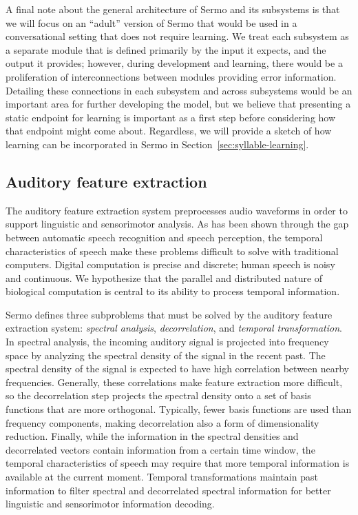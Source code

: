 A final note about
the general architecture of Sermo
and its subsystems
is that we will focus on an
``adult'' version of Sermo
that would be used in a conversational setting
that does not require learning.
We treat each subsystem as a separate
module that is defined primarily
by the input it expects,
and the output it provides;
however, during development
and learning,
there would be a proliferation of
interconnections between modules
providing error information.
Detailing these connections
in each subsystem and across subsystems
would be an important area
for further developing the model,
but we believe that presenting
a static endpoint for learning
is important as a first step
before considering
how that endpoint might come about.
Regardless, we will provide a sketch of
how learning can be incorporated in Sermo
in Section~\ref{sec:syllable-learning}.

\subsection{Auditory feature extraction}
\label{sec:model-ncc}


The auditory feature extraction system
preprocesses audio waveforms
in order to support
linguistic and sensorimotor analysis.
As has been shown through
the gap between
automatic speech recognition
and speech perception,
the temporal characteristics
of speech
make these problems
difficult to solve
with traditional computers.
Digital computation is precise and discrete;
human speech is noisy and continuous.
We hypothesize that the
parallel and distributed nature
of biological computation
is central to its
ability to process temporal information.

Sermo defines three subproblems
that must be solved
by the auditory feature extraction system:
\textit{spectral analysis},
\textit{decorrelation},
and \textit{temporal transformation}.
In spectral analysis,
the incoming auditory signal
is projected into frequency space
by analyzing the spectral density
of the signal in the recent past.
The spectral density of the signal
is expected to have high
correlation between nearby frequencies.
Generally, these correlations
make feature extraction more difficult,
so the decorrelation step
projects the spectral density
onto a set of basis functions
that are more orthogonal.
Typically, fewer basis functions
are used than frequency components,
making decorrelation also a form
of dimensionality reduction.
Finally, while the information
in the spectral densities
and decorrelated vectors
contain information from
a certain time window,
the temporal characteristics of speech
may require that more
temporal information is available
at the current moment.
Temporal transformations
maintain past information
to filter spectral
and decorrelated spectral information
for better linguistic
and sensorimotor information decoding.

